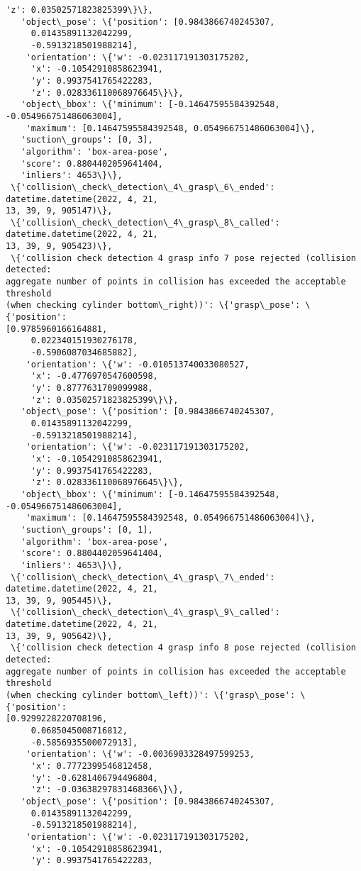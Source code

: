 \documentclass[11pt]{article}
\begin{document}
\begin{tcolorbox}[breakable, size=fbox, boxrule=.5pt, pad at break*=1mm, opacityfill=0]
\begin{Verbatim}[commandchars=\\\{\}]
     'z': 0.03502571823825399\}\},
   'object\_pose': \{'position': [0.9843866740245307,
     0.01435891132042299,
     -0.5913218501988214],
    'orientation': \{'w': -0.023117191303175202,
     'x': -0.10542910858623941,
     'y': 0.9937541765422283,
     'z': 0.028336110068976645\}\},
   'object\_bbox': \{'minimum': [-0.14647595584392548, -0.054966751486063004],
    'maximum': [0.14647595584392548, 0.054966751486063004]\},
   'suction\_groups': [0, 3],
   'algorithm': 'box-area-pose',
   'score': 0.8804402059641404,
   'inliers': 4653\}\},
 \{'collision\_check\_detection\_4\_grasp\_6\_ended': datetime.datetime(2022, 4, 21,
13, 39, 9, 905147)\},
 \{'collision\_check\_detection\_4\_grasp\_8\_called': datetime.datetime(2022, 4, 21,
13, 39, 9, 905423)\},
 \{'collision check detection 4 grasp info 7 pose rejected (collision detected:
aggregate number of points in collision has exceeded the acceptable threshold
(when checking cylinder bottom\_right))': \{'grasp\_pose': \{'position':
[0.9785960166164881,
     0.022340151930276178,
     -0.5906087034685882],
    'orientation': \{'w': -0.010513740033080527,
     'x': -0.4776970547600598,
     'y': 0.8777631709099988,
     'z': 0.03502571823825399\}\},
   'object\_pose': \{'position': [0.9843866740245307,
     0.01435891132042299,
     -0.5913218501988214],
    'orientation': \{'w': -0.023117191303175202,
     'x': -0.10542910858623941,
     'y': 0.9937541765422283,
     'z': 0.028336110068976645\}\},
   'object\_bbox': \{'minimum': [-0.14647595584392548, -0.054966751486063004],
    'maximum': [0.14647595584392548, 0.054966751486063004]\},
   'suction\_groups': [0, 1],
   'algorithm': 'box-area-pose',
   'score': 0.8804402059641404,
   'inliers': 4653\}\},
 \{'collision\_check\_detection\_4\_grasp\_7\_ended': datetime.datetime(2022, 4, 21,
13, 39, 9, 905445)\},
 \{'collision\_check\_detection\_4\_grasp\_9\_called': datetime.datetime(2022, 4, 21,
13, 39, 9, 905642)\},
 \{'collision check detection 4 grasp info 8 pose rejected (collision detected:
aggregate number of points in collision has exceeded the acceptable threshold
(when checking cylinder bottom\_left))': \{'grasp\_pose': \{'position':
[0.9299228220708196,
     0.0685045008716812,
     -0.5856935500072913],
    'orientation': \{'w': -0.0036903328497599253,
     'x': 0.7772399546812458,
     'y': -0.6281406794496804,
     'z': -0.03638297831468366\}\},
   'object\_pose': \{'position': [0.9843866740245307,
     0.01435891132042299,
     -0.5913218501988214],
    'orientation': \{'w': -0.023117191303175202,
     'x': -0.10542910858623941,
     'y': 0.9937541765422283,

\end{Verbatim}
\end{tcolorbox}
\end{document}
